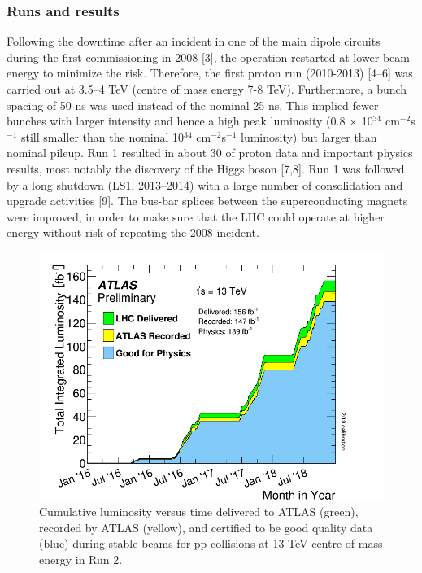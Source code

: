 \documentclass[letterpaper,12pt]{article}
\begin{document}
	\subsubsection{Runs and results}
	Following the downtime after an incident in one of the main dipole circuits 
	during the first commissioning in 2008 [3],
	the operation restarted at lower beam energy to minimize the risk. 
	Therefore, the first proton run (2010-2013) [4–6] was
	carried out at 3.5–4 TeV (centre of mass energy 7-8 TeV). Furthermore, a bunch spacing
	of 50 ns was used instead of the nominal 25 ns. 
	This implied fewer bunches with larger intensity and hence a 
	high peak luminosity (0.8 $\times$ 10$^{34}$ cm$^{-2}$s$^{-1}$ still smaller than
	the nominal 10$^{34}$ cm$^{-2}$s$^{-1}$ luminosity) but larger than nominal pileup. 
	Run 1 resulted in about 30 \fb of proton data and important physics results,
	most notably the discovery of the Higgs boson [7,8].
	Run 1 was followed by a long shutdown (LS1, 2013–2014)
	with a large number of consolidation and upgrade activities [9]. 	
	The bus-bar splices between the superconducting magnets were improved, 
	in order to make sure that the LHC could operate at higher energy 
	without risk of repeating the 2008 incident. 

	\begin{figure}[]
		\begin{centering}	
		\includegraphics[width=.4\textwidth]{Detector_plots/Run2_lumi.png}
		\caption{Cumulative luminosity versus time delivered to 
		ATLAS (green), recorded by ATLAS (yellow), and certified to be 
		good quality data (blue) during stable beams for pp collisions 
		at 13 TeV centre-of-mass energy in Run 2. 
			}
		\label{fig:Run2_lumi}
		\end{centering}
	\end{figure}
\end{document}
